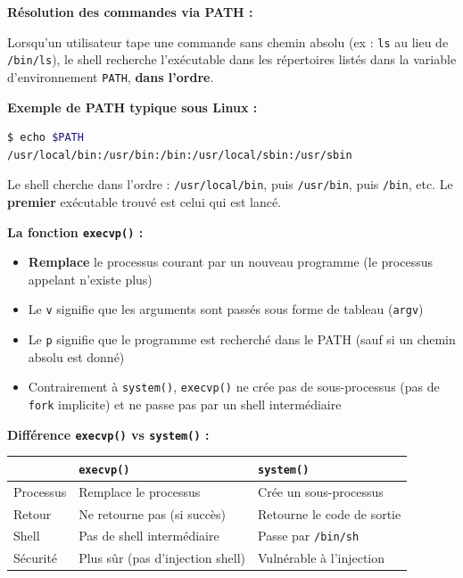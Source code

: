 \documentclass[a4paper,11pt]{article}
\theoremstyle{plain}
\theoremstyle{definition}
\begin{document}
\begin{rappel}
\textbf{Résolution des commandes via PATH :}

Lorsqu'un utilisateur tape une commande sans chemin absolu (ex : \texttt{ls} au lieu de \texttt{/bin/ls}), le shell recherche l'exécutable dans les répertoires listés dans la variable d'environnement \texttt{PATH}, \textbf{dans l'ordre}.

\medskip
\textbf{Exemple de PATH typique sous Linux :}
\begin{lstlisting}[numbers=none,language=bash]
$ echo $PATH
/usr/local/bin:/usr/bin:/bin:/usr/local/sbin:/usr/sbin
\end{lstlisting}

Le shell cherche dans l'ordre : \texttt{/usr/local/bin}, puis \texttt{/usr/bin}, puis \texttt{/bin}, etc. Le \textbf{premier} exécutable trouvé est celui qui est lancé.

\medskip
\textbf{La fonction \texttt{execvp()} :}
\begin{itemize}
    \item \textbf{Remplace} le processus courant par un nouveau programme (le processus appelant n'existe plus)
    \item Le \texttt{v} signifie que les arguments sont passés sous forme de tableau (\texttt{argv})
    \item Le \texttt{p} signifie que le programme est recherché dans le PATH (sauf si un chemin absolu est donné)
    \item Contrairement à \texttt{system()}, \texttt{execvp()} ne crée pas de sous-processus (pas de \texttt{fork} implicite) et ne passe pas par un shell intermédiaire
\end{itemize}

\medskip
\textbf{Différence \texttt{execvp()} vs \texttt{system()} :}

\begin{center}
\begin{tabular}{lll}
\toprule
& \texttt{execvp()} & \texttt{system()} \\
\midrule
Processus & Remplace le processus & Crée un sous-processus \\
Retour & Ne retourne pas (si succès) & Retourne le code de sortie \\
Shell & Pas de shell intermédiaire & Passe par \texttt{/bin/sh} \\
Sécurité & Plus sûr (pas d'injection shell) & Vulnérable à l'injection \\
\bottomrule
\end{tabular}
\end{center}
\end{rappel}
\end{document}
